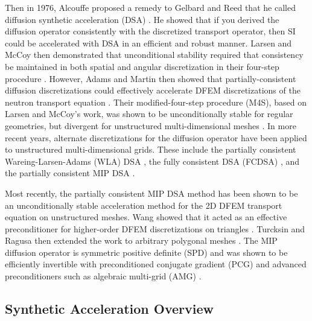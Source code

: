 Then in 1976, Alcouffe proposed a remedy to Gelbard and Reed that he called diffusion synthetic acceleration (DSA) \cite{alcouffe1976stable,alcouffe1977DSA,alcouffe1977diffusion}. He showed that if you derived the diffusion operator consistently with the discretized transport operator, then SI could be accelerated with DSA in an efficient and robust manner. Larsen and McCoy then demonstrated that unconditional stability required that consistency be maintained in both spatial and angular discretization in their four-step procedure \cite{larsen1982unconditionally_I,larsen1982unconditionally_II}. However, Adams and Martin then showed that partially-consistent diffusion discretizations could effectively accelerate DFEM discretizations of the neutron transport equation \cite{ref::dsa_DFEM_adams_martin}. Their modified-four-step procedure (M4S), based on Larsen and McCoy's work, was shown to be unconditionally stable for regular geometries, but divergent for unstructured multi-dimensional meshes \cite{warsa2002fully}. In more recent years, alternate discretizations for the diffusion operator have been applied to unstructured multi-dimensional grids. These include the partially consistent Wareing-Larsen-Adams (WLA) DSA \cite{ref::WLA_DSA}, the fully consistent DSA (FCDSA) \cite{warsa2002fully}, and the partially consistent MIP DSA \cite{ref::DSA_wang_ragusa,wang2009adaptive,turcksin2014discontinuous}.

Most recently, the partially consistent MIP DSA method has been shown to be an unconditionally stable acceleration method for the 2D DFEM transport equation on unstructured meshes. Wang showed that it acted as an effective preconditioner for higher-order DFEM discretizations on triangles \cite{ref::DSA_wang_ragusa,wang2009adaptive}. Turcksin and Ragusa then extended the work to arbitrary polygonal meshes \cite{turcksin2014discontinuous}. The MIP diffusion operator is symmetric positive definite (SPD) and was shown to be efficiently invertible with preconditioned conjugate gradient (PCG) and advanced preconditioners such as algebraic multi-grid (AMG) \cite{turcksin2014discontinuous}.

\subsection{Synthetic Acceleration Overview}
\label{sec::DSA_Introduction_SA}

